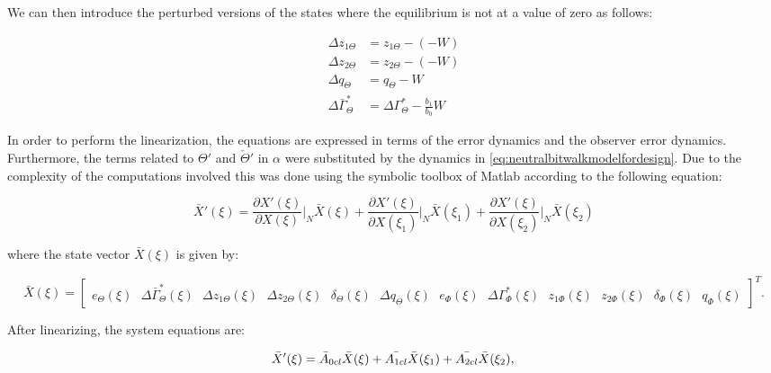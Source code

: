 \documentclass[main.tex]{subfiles}
\begin{document}
	We can then introduce the perturbed versions of the states where the equilibrium is not at a value of zero as follows:
	
	\begin{align}
		\Delta z_{1\Theta} &= z_{1\Theta} - (-W) \nonumber\\
		\Delta z_{2\Theta} &= z_{2\Theta} - (-W) \nonumber\\
		\Delta q_{\Theta} &= q_{\Theta} - W \nonumber\\
		\Delta \bar{\Gamma}_{\Theta}^* &= \Delta \Gamma_{\Theta}^* - \frac{b_1}{b_0}W 
	\end{align}
	
	

	In order to perform the linearization, the equations are expressed in terms of the error dynamics and the observer error dynamics. Furthermore, the terms related to $\Theta'$ and $\check{\Theta}'$ in $\alpha$ were substituted by the dynamics in \eqref{eq:neutralbitwalkmodelfordesign}. Due to the complexity of the computations involved this was done using the symbolic toolbox of Matlab according to the following equation:
	
			\begin{equation}
			\bar{X}'(\xi) =	\frac{\partial X'(\xi)}{\partial X(\xi)} \bigg|_N \bar{X}(\xi)
							+ \frac{\partial X'(\xi)}{\partial X(\xi_1)} \bigg|_N \bar{X}(\xi_1) + \frac{\partial X'(\xi)}{\partial X(\xi_2)} \bigg|_N \bar{X}(\xi_2)
			\label{eq:linearization}
			\end{equation}	
	
	
	where the state vector $\bar{X}(\xi)$ is given by:
	
	\begin{equation}
	\bar{X}(\xi) = \begin{bmatrix} 
	e_{\Theta}(\xi) \text{ }\Delta \bar{\Gamma}_\Theta^{*}(\xi) \text{ }\Delta z_{1\Theta}(\xi) \text{ }\Delta z_{2\Theta}(\xi) \text{ }\delta_{\Theta}(\xi) \text{ }\Delta q_\Theta(\xi) \text{ }e_{\Phi}(\xi) \text{ }\Delta \Gamma_\Phi^*(\xi) \text{ }z_{1\Phi}(\xi) \text{ }z_{2\Phi}(\xi) \text{ }\delta_{\Phi}(\xi) \text{ }q_\Phi(\xi)  \nonumber
	\end{bmatrix}^T.
	\end{equation}
	
	After linearizing, the system equations are:
		
	\begin{equation}
	\bar{X}'(\xi) =	\bar{A}_{0cl}\bar{X}(\xi) + \bar{A_{1cl}}\bar{X}(\xi_1) + \bar{A_{2cl}} \bar{X}(\xi_2),\\
	\label{eq:totaldynamicslinears}
	\end{equation}	
	
\end{document}
